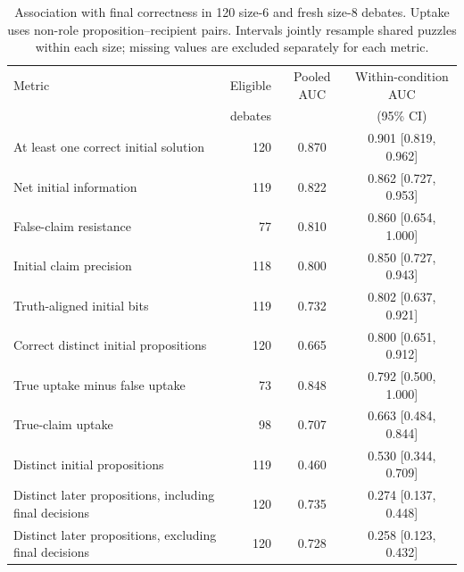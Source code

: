 \begin{table}[htbp]
\centering\small
\setlength{\tabcolsep}{3pt}
\caption{Association with final correctness in 120 size-6 and fresh size-8 debates. Uptake uses non-role proposition--recipient pairs. Intervals jointly resample shared puzzles within each size; missing values are excluded separately for each metric.}
\label{tab:debate-metric-auc-full}
\begin{tabularx}{\linewidth}{@{}Xrcc@{}}
\toprule
Metric & Eligible & Pooled AUC & Within-condition AUC \\
& debates & & (95\% CI) \\
\midrule
At least one correct initial solution & 120 & 0.870 & 0.901 [0.819, 0.962] \\
Net initial information & 119 & 0.822 & 0.862 [0.727, 0.953] \\
False-claim resistance & 77 & 0.810 & 0.860 [0.654, 1.000] \\
Initial claim precision & 118 & 0.800 & 0.850 [0.727, 0.943] \\
Truth-aligned initial bits & 119 & 0.732 & 0.802 [0.637, 0.921] \\
Correct distinct initial propositions & 120 & 0.665 & 0.800 [0.651, 0.912] \\
True uptake minus false uptake & 73 & 0.848 & 0.792 [0.500, 1.000] \\
True-claim uptake & 98 & 0.707 & 0.663 [0.484, 0.844] \\
Distinct initial propositions & 119 & 0.460 & 0.530 [0.344, 0.709] \\
Distinct later propositions, including final decisions & 120 & 0.735 & 0.274 [0.137, 0.448] \\
Distinct later propositions, excluding final decisions & 120 & 0.728 & 0.258 [0.123, 0.432] \\
\bottomrule
\end{tabularx}
\end{table}
